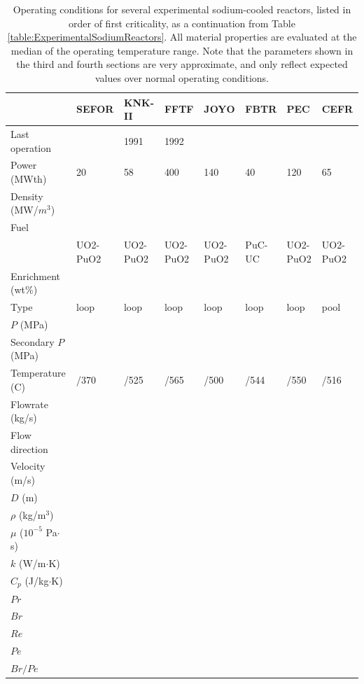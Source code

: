 \documentclass[10pt]{article}
\numberwithin{equation}{section} %
\begin{document}
\clearpage
\begin{table}
\begin{table}[H]
\caption{Operating conditions for several experimental sodium-cooled reactors, listed in order of first criticality, as a continuation from Table \ref{table:ExperimentalSodiumReactors}. All material properties are evaluated at the median of the operating temperature range. Note that the parameters shown in the third and fourth sections are very approximate, and only reflect expected values over normal operating conditions. }
\centering
\begin{tabular}{l l l l l l l l}
\hline\hline
 								& SEFOR		& KNK-II			& FFTF			& JOYO		& FBTR		& PEC			& CEFR\\ [0.5ex]
\hline
 Last operation						& 			& 1991			& 1992			& 			& 			& \\
 Power (MWth)						& 20			& 58				& 400			& 140		& 40			& 120			& 65\\
 Density (MW/\(m^3\))				& 			& 				& 				&			& 			& 				& \\
 \hdashline
 Fuel	 							& 			& 				& 				&			& \\
 								& UO2-PuO2	& UO2-PuO2		& UO2-PuO2		& UO2-PuO2	& PuC-UC		& UO2-PuO2		& UO2-PuO2\\
 Enrichment (wt\%)					& 			& 				&				& 			& \\
 \hdashline
 Type							& loop		& loop			& loop			& loop		& loop		& loop			& pool\\
 \(P\) (MPa)						&			& 				&				& 			& \\
 Secondary \(P\) (MPa)				& 			&				&				& 			& \\
 Temperature (C)					& /370		& /525			& /565			& /500		& /544		& /550			& /516\\
 Flowrate (kg/s)						& 			& \\
 Flow direction						& 			& \\
 \hdashline
 Velocity (m/s)						& 			& \\
  \(D\) (m)							&			& \\
 \(\rho\) (kg/\(\textrm{m}^3\))			&			& \\
 \(\mu\) (\(10^{-5}\) Pa\(\cdot\)s)			& 			& \\
 \(k\) (W/m\(\cdot\)K)					& 			& \\
 \(C_p\) (J/kg\(\cdot\)K)				& 			& \\
 \hdashline
 \(Pr\)							& 			& \\
 \(Br\)							&			& \\
 \(Re\)							&			& \\
 \(Pe\)							&			& \\
 \(Br/Pe\)							& 			& \\
\hline
\end{tabular}
\label{table:ExperimentalSodiumReactors2}
\end{table}
\end{table}
\end{document}
